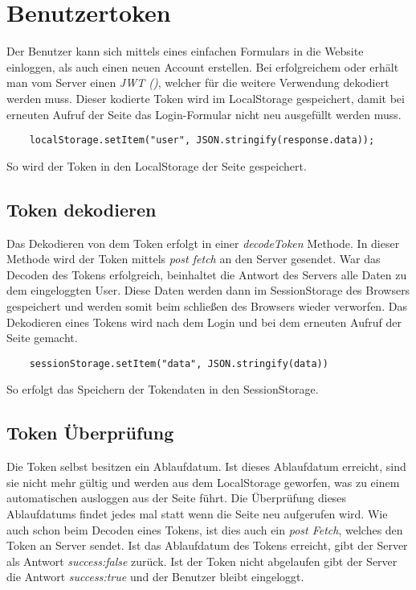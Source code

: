 \section{Benutzertoken}
\label{benutzer}

Der Benutzer kann sich mittels eines einfachen Formulars in die Website einloggen, als auch einen neuen 
Account erstellen. Bei erfolgreichem  oder  erhält man vom Server einen 
\textit{JWT ()}, welcher für die weitere Verwendung dekodiert werden muss. Dieser kodierte 
Token wird im LocalStorage gespeichert, damit bei erneuten Aufruf der Seite das Login-Formular nicht neu 
ausgefüllt werden muss.

\begin{lstlisting}
    localStorage.setItem("user", JSON.stringify(response.data));
\end{lstlisting}
So wird der Token in den LocalStorage der Seite gespeichert.

\subsection{Token dekodieren}

Das Dekodieren von dem Token erfolgt in einer \textit{decodeToken} Methode. In dieser Methode wird der 
Token mittels \textit{post fetch} an den Server gesendet. War das Decoden des Tokens erfolgreich, 
beinhaltet die Antwort des Servers alle Daten zu dem eingeloggten User. Diese Daten werden dann im 
SessionStorage des Browsers gespeichert und werden somit beim schließen des Browsers wieder verworfen. 
Das Dekodieren eines Tokens wird nach dem Login und bei dem erneuten Aufruf der Seite gemacht.
\begin{lstlisting}
    sessionStorage.setItem("data", JSON.stringify(data))
\end{lstlisting}
So erfolgt das Speichern der Tokendaten in den SessionStorage.

\subsection{Token Überprüfung}

Die Token selbst besitzen ein Ablaufdatum. Ist dieses Ablaufdatum erreicht, sind sie nicht mehr 
gültig und werden aus dem LocalStorage geworfen, was zu einem automatischen ausloggen aus der Seite führt. Die Überprüfung dieses Ablaufdatums 
findet jedes mal statt wenn die Seite neu aufgerufen wird. Wie auch schon beim Decoden eines Tokens,
ist dies auch ein \textit{post Fetch}, welches den Token an Server sendet. Ist das Ablaufdatum des
Tokens erreicht, gibt der Server als Antwort \textit{success:false} zurück. 
Ist der Token nicht abgelaufen gibt der Server die Antwort \textit{success:true} und 
der Benutzer bleibt eingeloggt. 

